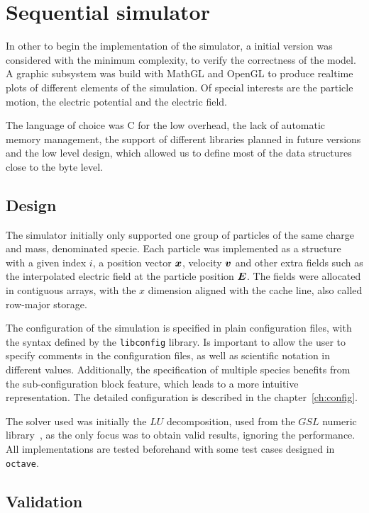 \chapter{Sequential simulator}
\label{ch:sequential}

In other to begin the implementation of the simulator, a initial version was
considered with the minimum complexity, to verify the correctness of the model.
A graphic subsystem was build with MathGL and OpenGL to produce realtime plots
of different elements of the simulation. Of special interests are the particle
motion, the electric potential and the electric field.

The language of choice was C for the low overhead, the lack of automatic memory
management, the support of different libraries planned in future versions and
the low level design, which allowed us to define most of the data structures
close to the byte level.

\section{Design}

The simulator initially only supported one group of particles of the same charge
and mass, denominated specie. Each particle was implemented as a structure with
a given index $i$, a position vector $\bm{x}$, velocity $\bm{v}$ and other extra fields
such as the interpolated electric field at the particle position $\bm{E}$.
%
The fields were allocated in contiguous arrays, with the $x$ dimension aligned
with the cache line, also called row-major storage.

The configuration of the simulation is specified in plain configuration files,
with the syntax defined by the \texttt{libconfig} library. Is important to allow
the user to specify comments in the configuration files, as well as scientific
notation in different values. Additionally, the specification of multiple species
benefits from the sub-configuration block feature, which leads to a more
intuitive representation. The detailed configuration is described in the
chapter~\ref{ch:config}.

The solver used was initially the $LU$ decomposition, used from the $GSL$
numeric library~\cite{gsl}, as the only focus was to obtain valid results, ignoring the
performance. All implementations are tested beforehand with some test cases
designed in \texttt{octave}.

\section{Validation}

